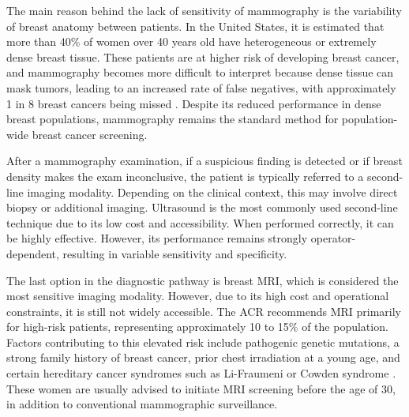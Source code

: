 \documentclass[12pt]{article}
\begin{document}
The main reason behind the lack of sensitivity of mammography is the variability of breast anatomy between patients. 
In the United States, it is estimated \cite{org_breast} that more than 40\% of women over 40 years old have heterogeneous or extremely dense breast tissue. 
These patients are at higher risk of developing breast cancer, and mammography becomes more difficult to interpret because dense tissue can mask tumors, leading to an increased rate of false negatives, with approximately 1 in 8 breast cancers being missed \cite{pu2026}.
Despite its reduced performance in dense breast populations, mammography remains the standard method for population-wide breast cancer screening.
\vspace{0.5cm}

After a mammography examination, if a suspicious finding is detected or if breast density makes the exam inconclusive, the patient is typically referred to a second-line imaging modality. 
Depending on the clinical context, this may involve direct biopsy or additional imaging. 
Ultrasound is the most commonly used second-line technique due to its low cost and accessibility. 
When performed correctly, it can be highly effective. 
However, its performance remains strongly operator-dependent, resulting in variable sensitivity and specificity.
\vspace{0.5cm}

The last option in the diagnostic pathway is breast MRI, which is considered the most sensitive imaging modality. 
However, due to its high cost and operational constraints, it is still not widely accessible. 
The ACR recommends MRI primarily for high-risk patients, representing approximately 10 to 15\% of the population.
Factors contributing to this elevated risk include pathogenic genetic mutations, a strong family history of breast cancer, prior chest irradiation at a young age, and certain hereditary cancer syndromes such as Li-Fraumeni or Cowden syndrome \cite{syndrom2026}.
These women are usually advised to initiate MRI screening before the age of 30, in addition to conventional mammographic surveillance.
\end{document}
